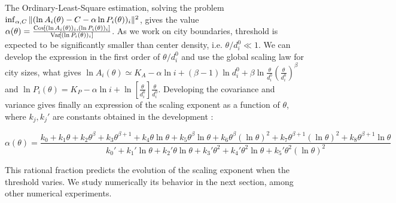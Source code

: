 The Ordinary-Least-Square estimation, solving the problem $\inf_{\alpha,C}\| (\ln{A_i(\theta)} - C - \alpha \ln{P_i(\theta)})_i \|^2$, gives the value $\alpha(\theta) = \frac{\operatorname{Cov}\!\left[(\ln{A_i(\theta)})_i,(\ln{P_i(\theta)})_i\right]}{\operatorname{Var}\!\left[(\ln{P_i(\theta)})_i\right]}$. As we work on city boundaries, threshold is expected to be significantly smaller than center density, i.e. $\theta / d_i^0 \ll 1$. We can develop the expression in the first order of $\theta / d_i^0$ and use the global scaling law for city sizes, what gives $\ln{A_i(\theta)} \simeq K_A - \alpha \ln{i} + (\beta - 1)\ln{d_i^0} + \beta \ln{\frac{\theta}{d_i^0}\left(\frac{\theta}{d_i^0}\right)^\beta} $ and $\ln{P_i(\theta)} = K_P - \alpha \ln{i} + \ln{\left[\frac{\theta}{d_i^0}\right]}\frac{\theta}{d_i^0}$. Developing the covariance and variance gives finally an expression of the scaling exponent as a function of $\theta$, where $k_j,{k_j}'$ are constants obtained in the development :

\begin{equation}
\label{eq:th}
\alpha(\theta) = \frac{k_0 + k_1 \theta + k_2 \theta^\beta + k_3 \theta^{\beta + 1} +  k_4 \theta \ln{\theta} + k_5 \theta^\beta \ln{\theta} + k_6 \theta^\beta (\ln{\theta})^2 + k_7 \theta^{\beta + 1}(\ln{\theta})^2 + k_8 \theta^{\beta + 1}\ln{\theta}}{k_0'+k_1' \ln{\theta} + k_2' \theta \ln{\theta} + k_3' \theta^2 + k_4' \theta^2\ln{\theta} + k_5' \theta^2 (\ln{\theta})^2}
\end{equation}

This rational fraction predicts the evolution of the scaling exponent when the threshold varies. We study numerically its behavior in the next section, among other numerical experiments.






